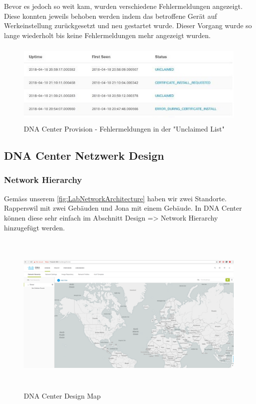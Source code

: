 Bevor es jedoch so weit kam, wurden verschiedene Fehlermeldungen angezeigt. Diese konnten jeweils behoben werden indem das betroffene Gerät auf Werkeinstellung zurückgesetzt und neu gestartet wurde. Dieser Vorgang wurde so lange wiederholt bis keine Fehlermeldungen mehr angezeigt wurden. 

\begin{figure}[H]
	\centering
	\includegraphics[height=4cm]{img/DNA_Center_Unclaimed_Errors_1.PNG}
	\caption{DNA Center Provision - Fehlermeldungen in der "Unclaimed List"}
	\label{fig:dna-center-provision-unclaimed-2}
\end{figure}

\subsection{DNA Center Netzwerk Design}

\subsubsection{Network Hierarchy}

Gemäss unserem \ref{fig:LabNetworkArchitecture} haben wir zwei Standorte. Rapperswil mit zwei Gebäuden und Jona mit einem Gebäude.
In DNA Center können diese sehr einfach im Abschnitt Design => Network Hierarchy hinzugefügt werden.

\begin{figure}[H]
	\centering
	\includegraphics[height=8cm]{img/Selection_011.png}
	\caption{DNA Center Design Map}
	\label{fig:dna-center-design-1}
\end{figure}

